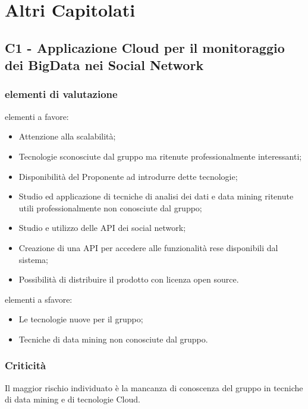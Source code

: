 \section{Altri Capitolati}
\subsection{C1 - Applicazione Cloud per il monitoraggio dei BigData nei Social Network}{
	\subsubsection{elementi di valutazione}{
		elementi a favore:
		\begin{itemize}
			\item Attenzione alla scalabilità;
			\item Tecnologie sconosciute dal gruppo ma ritenute professionalmente interessanti;
			\item Disponibilità del Proponente ad introdurre dette tecnologie;
			\item Studio ed applicazione di tecniche di analisi dei dati e data mining ritenute utili professionalmente non conosciute dal gruppo;
			\item Studio e utilizzo delle API dei social network;
			\item Creazione di una API per accedere alle funzionalità rese disponibili dal sistema;
			\item Possibilità di distribuire il prodotto con licenza open source.
		\end{itemize}
		
		elementi a sfavore:
		\begin{itemize}
			\item Le tecnologie nuove per il gruppo;
			\item Tecniche di data mining non conosciute dal gruppo.
		\end{itemize}
	}
	\subsubsection{Criticità}{
		Il maggior rischio individuato è la mancanza di conoscenza del gruppo in tecniche di data mining e di tecnologie Cloud.
	}
}
